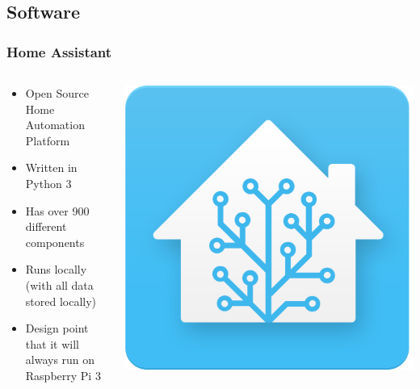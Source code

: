 \documentclass[aspectratio=169,11pt,hyperref={colorlinks=true}]{beamer}
\begin{document}
\subsection{Software}
\begin{frame}
    \frametitle{Home Assistant}
    \begin{columns}
        \begin{column}{.48\textwidth}
            \begin{itemize}
                \item Open Source Home Automation Platform
                \item Written in Python 3
                \item Has over 900 different components
                \item Runs locally (with all data stored locally)
                \item Design point that it will always run on Raspberry Pi 3
            \end{itemize}
        \end{column}
        \begin{column}{.48\textwidth}
            \includegraphics[width=\textwidth]{homeassistant.png}
        \end{column}
    \end{columns}
\end{frame}
\end{document}
